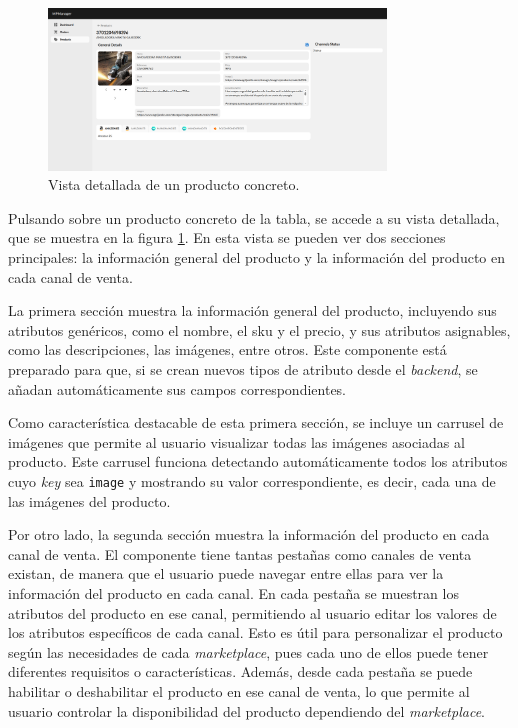 \begin{figure}[H]
    \centering
    \includegraphics[width=0.8\textwidth]{figures/design_develop/screenshots/detalle_producto.png}
    \caption{Vista detallada de un producto concreto.}
    \label{fig:dev:ss:vista_detallada_productos}
\end{figure}

Pulsando sobre un producto concreto de la tabla, se accede a su vista detallada, que se muestra en la figura \ref{fig:dev:ss:vista_detallada_productos}. En esta vista se pueden ver dos secciones principales: la información general del producto y la información del producto en cada canal de venta.

La primera sección muestra la información general del producto, incluyendo sus atributos genéricos, como el nombre, el \gls{sku} y el precio, y sus atributos asignables, como las descripciones, las imágenes, entre otros. Este componente está preparado para que, si se crean nuevos tipos de atributo desde el \textit{backend}, se añadan automáticamente sus campos correspondientes.

Como característica destacable de esta primera sección, se incluye un carrusel de imágenes que permite al usuario visualizar todas las imágenes asociadas al producto. Este carrusel funciona detectando automáticamente todos los atributos cuyo \textit{key} sea \texttt{image} y mostrando su valor correspondiente, es decir, cada una de las imágenes del producto.

Por otro lado, la segunda sección muestra la información del producto en cada canal de venta. El componente tiene tantas pestañas como canales de venta existan, de manera que el usuario puede navegar entre ellas para ver la información del producto en cada canal. En cada pestaña se muestran los atributos del producto en ese canal, permitiendo al usuario editar los valores de los atributos específicos de cada canal. Esto es útil para personalizar el producto según las necesidades de cada \textit{marketplace}, pues cada uno de ellos puede tener diferentes requisitos o características. Además, desde cada pestaña se puede habilitar o deshabilitar el producto en ese canal de venta, lo que permite al usuario controlar la disponibilidad del producto dependiendo del \textit{marketplace}.

